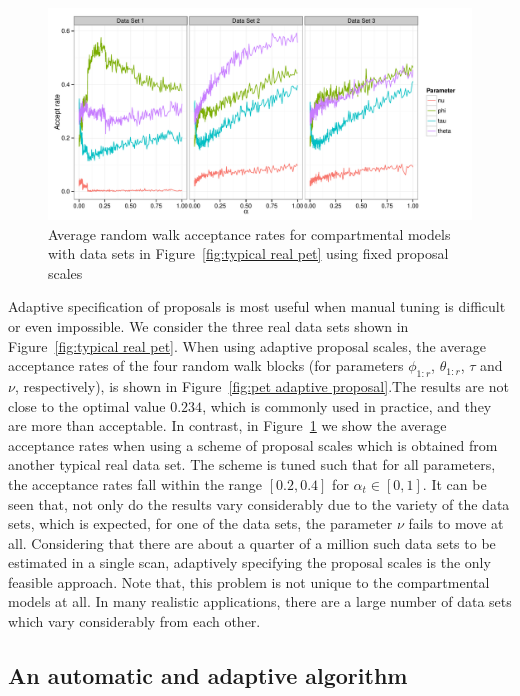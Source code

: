 \begin{figure}[t]
  \includegraphics[width=\linewidth]{fig/Fixed_Proposal}
  \caption[Acceptance rates of non-adaptive \protect\smc algorithms]
  {Average random walk acceptance rates for \pet compartmental models
    with data sets in Figure~\ref{fig:typical real pet} using fixed proposal
    scales}
  \label{fig:pet fixed proposal}
\end{figure}

Adaptive specification of proposals is most useful when manual tuning is
difficult or even impossible. We consider the three real \pet data sets shown
in Figure~\ref{fig:typical real pet}. When using adaptive proposal scales, the
average acceptance rates of the four random walk blocks (for parameters
$\phi_{1:r}$, $\theta_{1:r}$, $\tau$ and $\nu$, respectively), is shown in
Figure~\ref{fig:pet adaptive proposal}.The results are not close to the
optimal value $0.234$, which is commonly used in practice, and they are more
than acceptable. In contrast, in Figure~\ref{fig:pet fixed proposal} we show
the average acceptance rates when using a scheme of proposal scales which is
obtained from another typical real \pet data set. The scheme is tuned such
that for all parameters, the acceptance rates fall within the range $[0.2,
0.4]$ for $\alpha_t \in [0, 1]$. It can be seen that, not only do the results
vary considerably due to the variety of the data sets, which is expected, for
one of the data sets, the parameter $\nu$ fails to move at all. Considering
that there are about a quarter of a million such data sets to be estimated in
a single \pet scan, adaptively specifying the proposal scales is the only
feasible approach. Note that, this problem is not unique to the \pet
compartmental models at all. In many realistic applications, there are a large
number of data sets which vary considerably from each other.

\subsection{An automatic and adaptive algorithm}
\label{sub:An automatic and adaptive algorithm}

